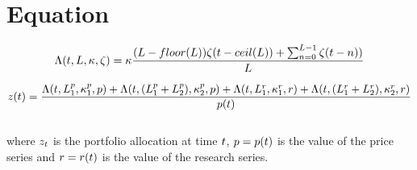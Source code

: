 \documentclass{article}
\begin{document}
\section{Equation}

\begin{equation}
\Lambda(t, L, \kappa, \zeta) = \kappa \frac{(L - floor(L)) \zeta(t - ceil(L)) +  \sum_{n=0}^{L-1} \zeta(t - n))}{L}
\end{equation}

\begin{equation}
z(t) = \frac{\Lambda(t, L_{1}^{p}, \kappa_{1}^{p}, p)+\Lambda(t, (L_{1}^{p} + L_{2}^{p}), \kappa_{2}^{p},p)+\Lambda(t, L_{1}^{r}, \kappa_{1}^{r}, r)+\Lambda(t, (L_{1}^{r} + L_{2}^{r}), \kappa_{2}^{r}, r)}{p(t)}
\end{equation}\\


\noindent where $z_t$ is the portfolio allocation at time $t$, $p = p(t)$ is the value of the price series and $r = r(t)$ is the value of the research series.

\hspace{200mm}
\hspace{200mm}

\keyterms
\furtherlinks
\end{document}
